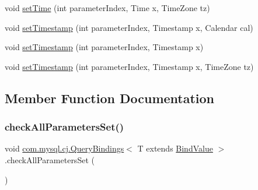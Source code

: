 \begin{DoxyCompactItemize}
\item 
void \mbox{\hyperlink{interfacecom_1_1mysql_1_1cj_1_1_query_bindings_a21ded062a41842f08c6f75878adfdc74}{set\+Time}} (int parameter\+Index, Time x, Time\+Zone tz)
\item 
void \mbox{\hyperlink{interfacecom_1_1mysql_1_1cj_1_1_query_bindings_ad61211668a8f9590103454e6b3b3b127}{set\+Timestamp}} (int parameter\+Index, Timestamp x, Calendar cal)
\item 
void \mbox{\hyperlink{interfacecom_1_1mysql_1_1cj_1_1_query_bindings_a08628284155246e9312c6c3dcd6ee54f}{set\+Timestamp}} (int parameter\+Index, Timestamp x)
\item 
void \mbox{\hyperlink{interfacecom_1_1mysql_1_1cj_1_1_query_bindings_aac572e044c4913263d2d078ac54e4043}{set\+Timestamp}} (int parameter\+Index, Timestamp x, Time\+Zone tz)
\end{DoxyCompactItemize}


\subsection{Member Function Documentation}
\mbox{\label{interfacecom_1_1mysql_1_1cj_1_1_query_bindings_a2c3998f19786a54dec34368742733a61}} 
\subsubsection{\texorpdfstring{check\+All\+Parameters\+Set()}{checkAllParametersSet()}}
{\footnotesize\ttfamily void \mbox{\hyperlink{interfacecom_1_1mysql_1_1cj_1_1_query_bindings}{com.\+mysql.\+cj.\+Query\+Bindings}}$<$ T extends \mbox{\hyperlink{interfacecom_1_1mysql_1_1cj_1_1_bind_value}{Bind\+Value}} $>$.check\+All\+Parameters\+Set (\begin{DoxyParamCaption}{ }\end{DoxyParamCaption})}

\mbox{\label{interfacecom_1_1mysql_1_1cj_1_1_query_bindings_a4413f6fc0016f5a9d571bb7e3460a974}} 
